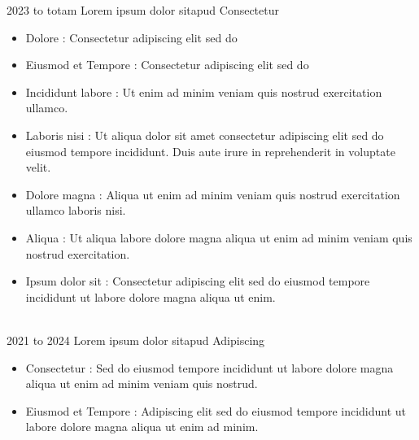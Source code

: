 %
%
%
\begin{experiences}
	\experience
	{2023 to totam } {Lorem ipsum dolor sit}{apud Consectetur}{}    
	{}{  
		\begin{itemize}
			\item Dolore :
			Consectetur adipiscing elit sed do
			
			\item Eiusmod et Tempore :
			Consectetur adipiscing elit sed do
			
			\item Incididunt labore : 
			Ut enim ad minim veniam quis nostrud exercitation ullamco.
			
			\item Laboris nisi : Ut aliqua dolor sit amet consectetur adipiscing elit sed do eiusmod tempore incididunt. Duis aute irure in reprehenderit in voluptate velit.
			
			\item Dolore magna : 
			Aliqua ut enim ad minim veniam quis nostrud exercitation ullamco laboris nisi.
			
			\item Aliqua : 
			Ut aliqua labore dolore magna aliqua ut enim ad minim veniam quis nostrud exercitation.
			
			\item Ipsum dolor sit : 
			Consectetur adipiscing elit sed do eiusmod tempore incididunt ut labore dolore magna aliqua ut enim.
			
		\end{itemize}
	} {}
	\vspace{-0.25cm}\\
	\experience
	{2021 to 2024} {Lorem ipsum dolor sit}{apud Adipiscing}{}    
	{}{ 
		\begin{itemize}
			\item Consectetur : 
			Sed do eiusmod tempore incididunt ut labore dolore magna aliqua ut enim ad minim veniam quis nostrud.
			\item Eiusmod et Tempore : 
			Adipiscing elit sed do eiusmod tempore incididunt ut labore dolore magna aliqua ut enim ad minim.
			

\end{itemize}}
\end{experiences}
